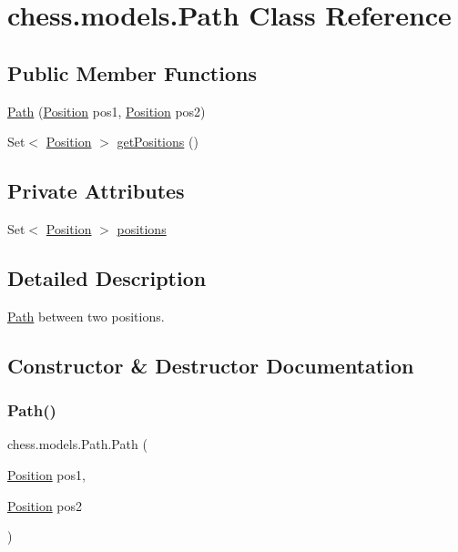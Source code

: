 \hypertarget{classchess_1_1models_1_1_path}{}\section{chess.\+models.\+Path Class Reference}
\label{classchess_1_1models_1_1_path}
\subsection*{Public Member Functions}
\begin{DoxyCompactItemize}
\item 
\mbox{\hyperlink{classchess_1_1models_1_1_path_a5ddc0a03cb1c2b1dd93f77dbecfcdc27}{Path}} (\mbox{\hyperlink{classchess_1_1models_1_1_position}{Position}} pos1, \mbox{\hyperlink{classchess_1_1models_1_1_position}{Position}} pos2)
\item 
Set$<$ \mbox{\hyperlink{classchess_1_1models_1_1_position}{Position}} $>$ \mbox{\hyperlink{classchess_1_1models_1_1_path_adce43d0b62fd3ba9d7ac261fcf4cf7b1}{get\+Positions}} ()
\end{DoxyCompactItemize}
\subsection*{Private Attributes}
\begin{DoxyCompactItemize}
\item 
Set$<$ \mbox{\hyperlink{classchess_1_1models_1_1_position}{Position}} $>$ \mbox{\hyperlink{classchess_1_1models_1_1_path_abfd1faa7caf599ad3d8a2a0fa03ee883}{positions}}
\end{DoxyCompactItemize}


\subsection{Detailed Description}
\mbox{\hyperlink{classchess_1_1models_1_1_path}{Path}} between two positions. 

\subsection{Constructor \& Destructor Documentation}
\mbox{\label{classchess_1_1models_1_1_path_a5ddc0a03cb1c2b1dd93f77dbecfcdc27}} 
\subsubsection{\texorpdfstring{Path()}{Path()}}
{\footnotesize\ttfamily chess.\+models.\+Path.\+Path (\begin{DoxyParamCaption}\item[{\mbox{\hyperlink{classchess_1_1models_1_1_position}{Position}}}]{pos1,  }\item[{\mbox{\hyperlink{classchess_1_1models_1_1_position}{Position}}}]{pos2 }\end{DoxyParamCaption})}

